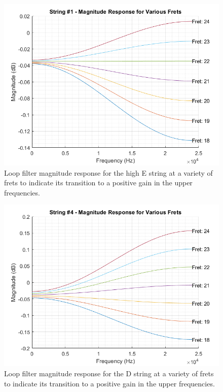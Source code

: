 \documentclass[../main.tex]{subfiles}
\begin{document}
\begin{figure}[h]
    \centering
    \includegraphics[scale=.65]{./images/plots/Unstable Loop Filter - String 1.png}
    \caption{Loop filter magnitude response for the high E string at a variety of frets to indicate its transition to a positive gain in the upper frequencies.}
    \label{fig:UnstableLoopString1}
\end{figure}

\begin{figure}[h]
    \centering
    \includegraphics[scale=.65]{./images/plots/Unstable Loop Filter - String 4.png}
    \caption{Loop filter magnitude response for the D string at a variety of frets to indicate its transition to a positive gain in the upper frequencies.}
    \label{fig:UnstableLoopString4}
\end{figure}
\end{document}

